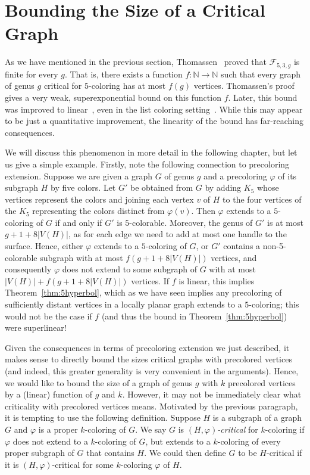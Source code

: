 \documentclass[12pt,twoside,openright,a4paper]{book}
\newcommand{\FF}{\mathcal{F}}
\begin{document}
\section{Bounding the Size of a Critical Graph}

As we have mentioned in the previous section, Thomassen~\cite{Thomassen97} proved that $\FF_{5,3,g}$ is finite for every $g$.
That is, there exists a function $f:\mathbb{N}\to\mathbb{N}$ such that every graph of genus $g$ critical for $5$-coloring
has at most $f(g)$ vertices.  Thomassen's proof gives a very weak, superexponential bound on this function $f$.
Later, this bound was improved to linear~\cite{pothom}, even in the list coloring setting~\cite{lukethe}.
While this may appear to be just a quantitative improvement, the linearity of the bound has far-reaching consequences.

We will discuss this phenomenon in more detail in the following chapter, but let us give a simple example.
Firstly, note the following connection to precoloring extension.  Suppose we are given a graph $G$ of genus $g$
and a precoloring $\varphi$ of its subgraph $H$ by five colors.  Let $G'$ be obtained from $G$ by adding $K_5$
whose vertices represent the colors and joining each vertex $v$ of $H$ to the four vertices of the $K_5$ representing
the colors distinct from $\varphi(v)$.  Then $\varphi$ extends to a $5$-coloring of $G$ if and only if $G'$ is $5$-colorable.
Moreover, the genus of $G'$ is at most $g+1+8|V(H)|$, as for each edge we need to add at most one handle to the surface.
Hence, either $\varphi$ extends to a $5$-coloring of $G$, or $G'$ contains a non-5-colorable subgraph with at most $f(g+1+8|V(H)|)$
vertices, and consequently $\varphi$ does not extend to some subgraph of $G$ with at most $|V(H)|+f(g+1+8|V(H)|)$ vertices.
If $f$ is linear, this implies Theorem~\ref{thm:5hyperbol}, which as we have seen implies any precoloring of sufficiently
distant vertices in a locally planar graph extends to a $5$-coloring; this would not be the case if $f$ (and thus the bound in Theorem~\ref{thm:5hyperbol})
were superlinear!

Given the consequences in terms of precoloring extension we just described, it makes sense to directly
bound the sizes critical graphs with precolored vertices (and indeed, this greater generality is very
convenient in the arguments).  Hence, we would like to bound the size of a graph of genus $g$
with $k$ precolored vertices by a (linear) function of $g$ and $k$.
However, it may not be immediately clear what criticality with precolored vertices means.
Motivated by the previous paragraph, it is tempting to use the following definition.
Suppose $H$ is a subgraph of a graph $G$ and $\varphi$ is a proper $k$-coloring of $G$.
We say $G$ is \emph{$(H,\varphi)$-critical} for $k$-coloring if $\varphi$ does not extend to a $k$-coloring of $G$,
but extends to a $k$-coloring of every proper subgraph of $G$ that contains $H$.
We could then define $G$ to be $H$-critical if it is $(H,\varphi)$-critical for some $k$-coloring $\varphi$ of $H$.
\end{document}
